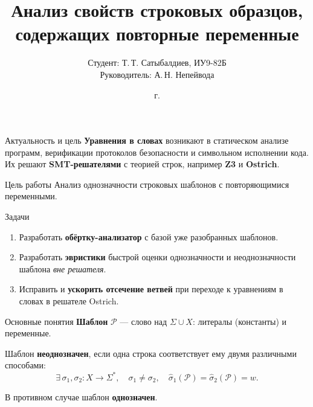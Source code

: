 \documentclass[aspectratio=169,11pt]{beamer}
\title[Однозначность строковых образцов]{Анализ свойств строковых образцов,\\содержащих повторные переменные}
\author[Т.\,Т. Сатыбалдиев]{Студент: Т.\,Т. Сатыбалдиев, ИУ9-82Б\\Руководитель: А.\,Н. Непейвода}
\institute[МГТУ им. Н.Э. Баумана]{МГТУ им. Н.Э. Баумана\\Кафедра <<Теоретическая информатика и компьютерные технологии>>}
\date{\the\year{} г.}
\newcommand{\PP}{\mathcal{P}}
\newcommand{\Sig}{\Sigma}
\begin{document}
\begin{frame}[plain]
  \titlepage
\end{frame}

\begin{frame}{Актуальность и цель}
  \textbf{Уравнения в словах} возникают в статическом анализе программ,
  верификации протоколов безопасности и символьном исполнении кода. Их решают
  \textbf{SMT-решателями} с теорией строк, например \textbf{Z3} и \textbf{Ostrich}.

  \medskip
  \begin{block}{Цель работы}
    Анализ однозначности строковых шаблонов с повторяющимися переменными.
  \end{block}
\end{frame}

\begin{frame}{Задачи}
  \begin{block}{}
    \begin{enumerate}\setlength{\itemsep}{10pt}
      \item Разработать \textbf{обёртку-анализатор} с базой уже разобранных шаблонов.
      \item Разработать \textbf{эвристики} быстрой оценки однозначности и
            неоднозначности шаблона \emph{вне решателя}.
      \item Исправить и \textbf{ускорить отсечение ветвей} при переходе к
            уравнениям в словах в решателе Ostrich.
    \end{enumerate}
  \end{block}
\end{frame}

\begin{frame}{Основные понятия}
  \textbf{Шаблон} $\PP$ --- слово над $\Sig\cup X$: литералы (константы) и переменные.

  \bigskip
  Шаблон \textbf{неоднозначен}, если одна строка соответствует ему двумя
  различными способами:
  \[
    \exists\,\sigma_1,\sigma_2:X\to\Sig^*,\quad \sigma_1\neq\sigma_2,\quad
    \hat\sigma_1(\PP)=\hat\sigma_2(\PP)=w.
  \]

  \bigskip
  В противном случае шаблон \textbf{однозначен}.
\end{frame}
\end{document}
